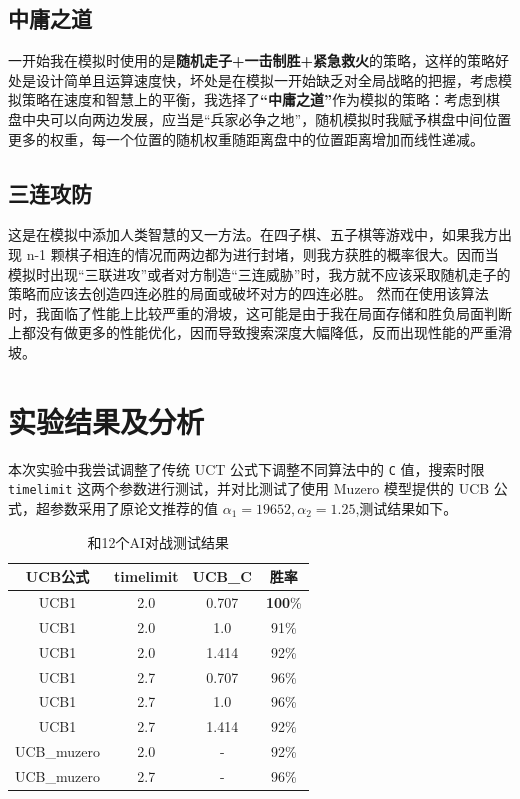 \documentclass{article}
\begin{document}
\begin{spacing}{1.1}
	\subsection{中庸之道}
	\hspace{1.4em}
	一开始我在模拟时使用的是\textbf{随机走子+一击制胜+紧急救火}的策略，这样的策略好处是设计简单且运算速度快，坏处是在模拟一开始缺乏对全局战略的把握，考虑模拟策略在速度和智慧上的平衡，我选择了\textbf{“中庸之道”}作为模拟的策略：考虑到棋盘中央可以向两边发展，应当是“兵家必争之地”，随机模拟时我赋予棋盘中间位置更多的权重，每一个位置的随机权重随距离盘中的位置距离增加而线性递减。
	
	\subsection{三连攻防}
	\hspace{1.4em}
	这是在模拟中添加人类智慧的又一方法。在四子棋、五子棋等游戏中，如果我方出现 n-1 颗棋子相连的情况而两边都为进行封堵，则我方获胜的概率很大。因而当模拟时出现“三联进攻”或者对方制造“三连威胁”时，我方就不应该采取随机走子的策略而应该去创造四连必胜的局面或破坏对方的四连必胜。
	然而在使用该算法时，我面临了性能上比较严重的滑坡，这可能是由于我在局面存储和胜负局面判断上都没有做更多的性能优化，因而导致搜索深度大幅降低，反而出现性能的严重滑坡。
\section{实验结果及分析}
	\hspace{1.4em}
	本次实验中我尝试调整了传统 UCT 公式下调整不同算法中的 \verb|C| 值，搜索时限 \verb|timelimit| 这两个参数进行测试，并对比测试了使用 Muzero 模型提供的 UCB 公式，超参数采用了原论文推荐的值 $\alpha_1 = 19652, \alpha_2 =1.25 $,测试结果如下。
		\begin{table}[h]
		\center
		\begin{tabular}{c|c|c|c}
			\textbf{UCB公式} & \textbf{timelimit} & \textbf{UCB\_C} & \textbf{胜率} \\
			\hline
			UCB1 & 2.0 & 0.707 & \textbf{100}\%\\
			\hline
			UCB1  & 2.0 & 1.0 & 91\%\\
			\hline
			UCB1 & 2.0 & 1.414 & 92\%\\
			\hline
			UCB1 & 2.7 & 0.707 & 96\%\\
			\hline
			UCB1  & 2.7 & 1.0 & 96\%\\
			\hline
			UCB1 & 2.7 & 1.414 & 92\%\\
			\hline
			UCB\_muzero & 2.0 & - & 92\%\\
			\hline
			UCB\_muzero  & 2.7 & - & 96\%\\
		\end{tabular}
		\caption{和12个AI对战测试结果}
	\end{table}



\end{spacing}
\end{document}
